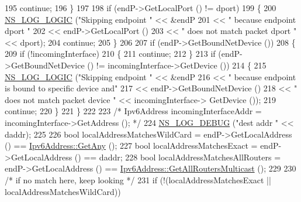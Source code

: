 \begin{DoxyCode}
195           \textcolor{keywordflow}{continue};
196         \}
197 
198       \textcolor{keywordflow}{if} (endP->GetLocalPort () != dport)
199         \{
200           \hyperlink{group__logging_ga88acd260151caf2db9c0fc84997f45ce}{NS\_LOG\_LOGIC} (\textcolor{stringliteral}{"Skipping endpoint "} << &endP
201                                              << \textcolor{stringliteral}{" because endpoint dport "}
202                                              << endP->GetLocalPort ()
203                                              << \textcolor{stringliteral}{" does not match packet dport "} << dport);
204           \textcolor{keywordflow}{continue};
205         \}
206 
207       \textcolor{keywordflow}{if} (endP->GetBoundNetDevice ())
208         \{
209           \textcolor{keywordflow}{if} (!incomingInterface)
210             \{
211               \textcolor{keywordflow}{continue};
212             \}
213           \textcolor{keywordflow}{if} (endP->GetBoundNetDevice () != incomingInterface->GetDevice ())
214             \{
215               \hyperlink{group__logging_ga88acd260151caf2db9c0fc84997f45ce}{NS\_LOG\_LOGIC} (\textcolor{stringliteral}{"Skipping endpoint "} << &endP
216                                                  << \textcolor{stringliteral}{" because endpoint is bound to specific device and"}
217                                                  << endP->GetBoundNetDevice ()
218                                                  << \textcolor{stringliteral}{" does not match packet device "} << incomingInterface->
      GetDevice ());
219               \textcolor{keywordflow}{continue};
220             \}
221         \}
222 
223       \textcolor{comment}{/*    Ipv6Address incomingInterfaceAddr = incomingInterface->GetAddress (); */}
224       \hyperlink{group__logging_ga413f1886406d49f59a6a0a89b77b4d0a}{NS\_LOG\_DEBUG} (\textcolor{stringliteral}{"dest addr "} << daddr);
225 
226       \textcolor{keywordtype}{bool} localAddressMatchesWildCard = endP->GetLocalAddress () == 
      \hyperlink{classns3_1_1Ipv6Address_a2783e8badfc98c8b0a8508bba6e1b91e}{Ipv6Address::GetAny} ();
227       \textcolor{keywordtype}{bool} localAddressMatchesExact = endP->GetLocalAddress () == daddr;
228       \textcolor{keywordtype}{bool} localAddressMatchesAllRouters = endP->GetLocalAddress () == 
      \hyperlink{classns3_1_1Ipv6Address_aae006ec0f2c8e0cfd792cc1427f493cf}{Ipv6Address::GetAllRoutersMulticast} ();
229 
230       \textcolor{comment}{/* if no match here, keep looking */}
231       \textcolor{keywordflow}{if} (!(localAddressMatchesExact || localAddressMatchesWildCard))

\end{DoxyCode}
